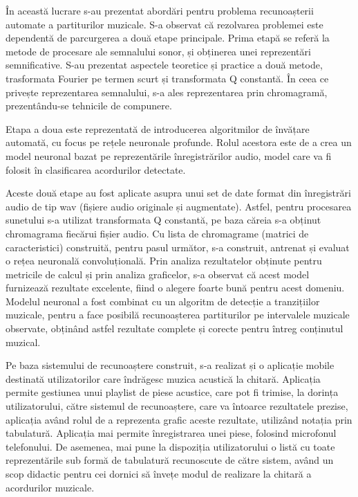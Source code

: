 \documentclass[a4paper,12pt]{report}
\begin{document}
În această lucrare s-au prezentat abordări pentru 
problema recunoașterii automate a partiturilor muzicale.
S-a observat că rezolvarea problemei este dependentă 
de parcurgerea a două etape principale. 
Prima etapă se referă la metode de procesare ale 
semnalului sonor, și obținerea unei reprezentări
semnificative.
S-au prezentat aspectele teoretice și practice 
a două metode, trasformata Fourier pe termen scurt și 
transformata Q constantă. În ceea ce privește reprezentarea 
semnalului, s-a ales reprezentarea prin chromagramă, prezentându-se 
tehnicile de compunere.

Etapa a doua este reprezentată de introducerea algoritmilor 
de învățare automată, cu focus pe rețele neuronale profunde. 
Rolul acestora este de a crea un model neuronal bazat pe 
reprezentările înregistrărilor audio, model care 
va fi folosit în clasificarea acordurilor detectate.

Aceste două etape au fost aplicate asupra unui set 
de date format din înregistrări audio de tip wav (fișiere audio 
originale și augmentate). Astfel, pentru procesarea sunetului s-a 
utilizat transformata Q constantă, pe baza căreia s-a obținut 
chromagrama fiecărui fișier audio. Cu lista de chromagrame 
(matrici de caracteristici) construită, pentru pasul următor, 
s-a construit, antrenat și evaluat o rețea neuronală convoluțională. 
Prin analiza rezultatelor obținute pentru 
metricile de calcul și prin analiza graficelor, 
s-a observat că acest model furnizează rezultate excelente, fiind 
o alegere foarte bună pentru acest domeniu. Modelul neuronal a fost 
combinat cu un algoritm de detecție a tranzițiilor muzicale, pentru 
a face posibilă recunoașterea partiturilor 
pe intervalele muzicale observate, obținând astfel 
rezultate complete și corecte pentru întreg conținutul 
muzical.

Pe baza sistemului de recunoaștere construit, s-a realizat și o 
aplicație mobile destinată utilizatorilor care îndrăgesc muzica 
acustică la chitară. Aplicația permite gestiunea unui 
playlist de piese acustice, care pot fi trimise, 
la dorința utilizatorului, către sistemul de recunoaștere, 
care va întoarce rezultatele prezise, aplicația având 
rolul de a reprezenta grafic aceste rezultate, utilizând notația prin 
tabulatură. Aplicația mai permite înregistrarea unei piese, folosind 
microfonul telefonului. De asemenea, mai pune la dispoziția utilizatorului 
o listă cu toate reprezentările sub formă de tabulatură recunoscute 
de către sistem, având un scop didactic pentru cei dornici să 
învețe modul de realizare la chitară a acordurilor muzicale.
\end{document}
